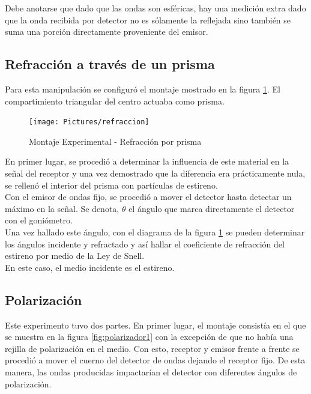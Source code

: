 \documentclass[prb,aps,twocolumn,preprintnumbers,amsmath,amssymb]{revtex4}
\begin{document}
Debe anotarse que dado que las ondas son esféricas, hay una medición extra dado que la onda recibida por detector no es sólamente la reflejada sino también se suma una porción directamente proveniente del emisor.\\

\subsection{\label{sec:level2}Refracción a través de un prisma}

Para esta manipulación se configuró el montaje mostrado en la figura \ref{fig:refraccion}. El compartimiento triangular del centro actuaba como prisma. \\

\begin{figure}[h!]
\centering
\texttt{[image: Pictures/refraccion]}
\caption{Montaje Experimental - Refracción por prisma}
\label{fig:refraccion}
\end{figure}
 
En primer lugar, se procedió a determinar la influencia de este material en la señal del receptor y una vez demostrado que la diferencia era prácticamente nula, se rellenó el interior del prisma con partículas de estireno.\\ 

Con el emisor de ondas fijo, se procedió a mover el detector hasta detectar un máximo en la señal.  Se denota, $ \theta $ el ángulo que marca directamente el detector con el goniómetro. \\

Una vez hallado este ángulo, con el diagrama de la figura \ref{fig:refraccion} se pueden determinar los ángulos incidente y refractado y así hallar el coeficiente de refracción del estireno por medio de la Ley de Snell. \\

En este caso, el medio incidente es el estireno.\\
 
\subsection{\label{sec:level2}Polarización}

Este experimento tuvo dos partes. En primer lugar, el montaje consistía en el que se muestra en la figura \ref{fig:polarizador1} con la excepción de que no había una rejilla de polarización en el medio. Con esto, receptor y emisor frente a frente se procedió a mover el cuerno del detector de ondas dejando el receptor fijo. De esta manera, las ondas producidas impactarían el detector con diferentes ángulos de polarización. \\ 
\end{document}
